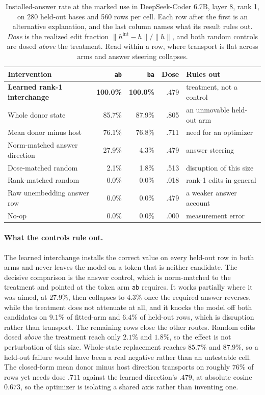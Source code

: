 \documentclass{article}
\begin{document}
\begin{table}[t]
\centering
\small
\setlength{\tabcolsep}{5pt}
\caption{Installed-answer rate at the marked use in DeepSeek-Coder 6.7B, layer 8, rank 1, on 280 held-out bases and 560 rows per cell. Each row after the first is an alternative explanation, and the last column names what its result rules out. \emph{Dose} is the realized edit fraction $\|h^{\mathrm{int}}-h\|/\|h\|$, and both random controls are dosed \emph{above} the treatment. Read within a row, where transport is flat across arms and answer steering collapses.}
\label{tab:causal-main}
\begin{tabular}{lrrrl}
\toprule
Intervention & \texttt{ab} & \texttt{ba} & Dose & Rules out \\
\midrule
\textcolor{bindblue}{\textbf{Learned rank-1 interchange}} & \textbf{100.0\%} & \textbf{100.0\%} & .479 & treatment, not a control \\
\midrule
Whole donor state & 85.7\% & 87.9\% & .805 & an unmovable held-out arm \\
Mean donor minus host & 76.1\% & 76.8\% & .711 & need for an optimizer \\
\textcolor{surforange}{Norm-matched answer direction} & 27.9\% & \textcolor{surforange}{4.3\%} & .479 & answer steering \\
Dose-matched random & 2.1\% & 1.8\% & .513 & disruption of this size \\
Rank-matched random & 0.0\% & 0.0\% & .018 & rank-1 edits in general \\
Raw unembedding answer row & 0.0\% & 0.0\% & .479 & a weaker answer account \\
No-op & 0.0\% & 0.0\% & .000 & measurement error \\
\bottomrule
\end{tabular}
\end{table}

\paragraph{What the controls rule out.}
The learned interchange installs the correct value on every held-out row in both arms and never leaves the model on a token that is neither candidate. The decisive comparison is the answer control, which is norm-matched to the treatment and pointed at the token arm \texttt{ab} requires. It works partially where it was aimed, at $27.9\%$, then collapses to $4.3\%$ once the required answer reverses, while the treatment does not attenuate at all, and it knocks the model off both candidates on $9.1\%$ of fitted-arm and $6.4\%$ of held-out rows, which is disruption rather than transport. The remaining rows close the other routes. Random edits dosed \emph{above} the treatment reach only $2.1\%$ and $1.8\%$, so the effect is not perturbation of this size. Whole-state replacement reaches $85.7\%$ and $87.9\%$, so a held-out failure would have been a real negative rather than an untestable cell. The closed-form mean donor minus host direction transports on roughly $76\%$ of rows yet needs dose $.711$ against the learned direction's $.479$, at absolute cosine $0.673$, so the optimizer is isolating a shared axis rather than inventing one.
\end{document}
